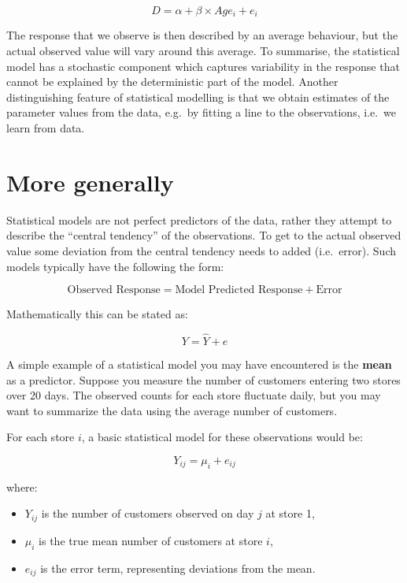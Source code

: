 \documentclass[
  letterpaper,
]{book}
\providecommand{\tightlist}{%
  \setlength{\itemsep}{0pt}\setlength{\parskip}{0pt}}\usepackage{longtable,booktabs,array}
\begin{document}
\[D = \alpha + \beta \times Age_i + e_i\]

The response that we observe is then described by an average behaviour,
but the actual observed value will vary around this average. To
summarise, the statistical model has a stochastic component which
captures variability in the response that cannot be explained by the
deterministic part of the model. Another distinguishing feature of
statistical modelling is that we obtain estimates of the parameter
values from the data, e.g.~by fitting a line to the observations,
i.e.~we learn from data.

\section*{More generally}\label{more-generally}


Statistical models are not perfect predictors of the data, rather they
attempt to describe the ``central tendency'' of the observations. To get
to the actual observed value some deviation from the central tendency
needs to added (i.e.~error). Such models typically have the following
the form:

\[
\text{Observed Response} = \text{Model Predicted Response} + \text{Error}
\]

Mathematically this can be stated as:

\[Y = \hat{Y} + e\]

A simple example of a statistical model you may have encountered is the
\textbf{mean} as a predictor. Suppose you measure the number of
customers entering two stores over 20 days. The observed counts for each
store fluctuate daily, but you may want to summarize the data using the
average number of customers.

For each store \(i\), a basic statistical model for these observations
would be:

\[
Y_{ij} = \mu_i + e_{ij}
\]

where:

\begin{itemize}
\tightlist
\item
  \(Y_{ij}\) is the number of customers observed on day \(j\) at store
  1,
\item
  \(\mu_i\) is the true mean number of customers at store \(i\),
\item
  \(e_{ij}\) is the error term, representing deviations from the mean.
\end{itemize}
\end{document}
